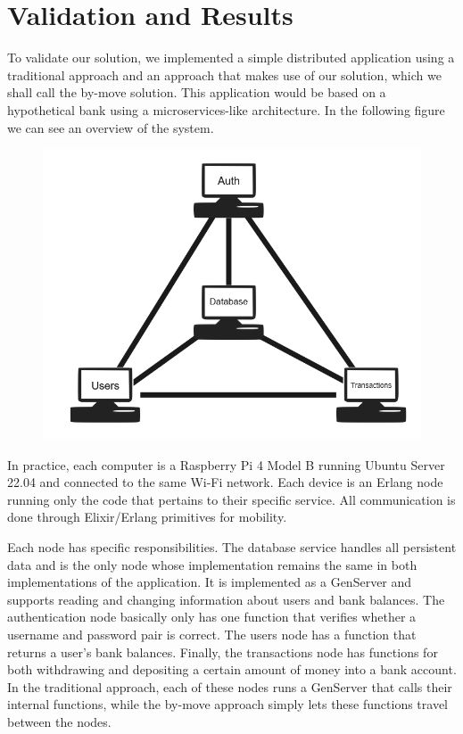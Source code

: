 
\chapter{Validation and Results}
\label{cha:validationresults}

To validate our solution, we implemented a simple distributed application using a traditional approach and an approach that makes use of our solution, which we shall call the by-move solution. This application would be based on a hypothetical bank using a microservices-like architecture. In the following figure we can see an overview of the system.
\begin{figure}[h]
\includegraphics[scale=0.60]{figures/validation.png}
\centering
\end{figure}

In practice, each computer is a Raspberry Pi 4 Model B running Ubuntu Server 22.04 and connected to the same Wi-Fi network. Each device is an Erlang node running only the code that pertains to their specific service. All communication is done through Elixir/Erlang primitives for mobility.

Each node has specific responsibilities. The database service handles all persistent data and is the only node whose implementation remains the same in both implementations of the application. It is implemented as a GenServer and supports reading and changing information about users and bank balances. The authentication node basically only has one function that verifies whether a username and password pair is correct. The users node has a function that returns a user's bank balances. Finally, the transactions node has functions for both withdrawing and depositing a certain amount of money into a bank account. In the traditional approach, each of these nodes runs a GenServer that calls their internal functions, while the by-move approach simply lets these functions travel between the nodes.

